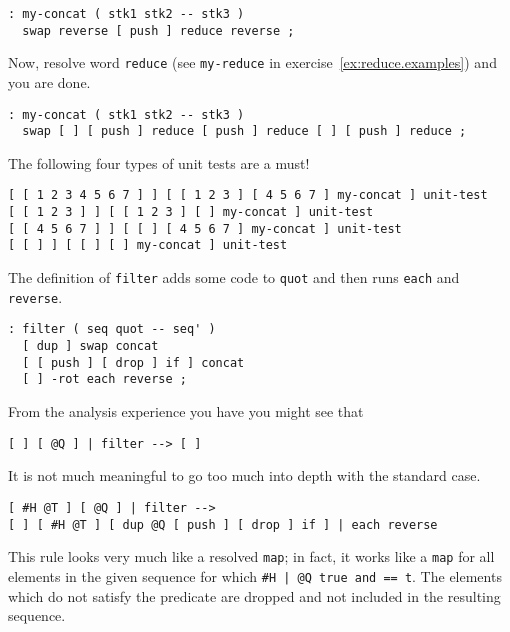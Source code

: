 \begin{verbatim}
: my-concat ( stk1 stk2 -- stk3 )
  swap reverse [ push ] reduce reverse ;
\end{verbatim}

Now, resolve word \verb|reduce| (see \verb|my-reduce| in exercise~\ref{ex:reduce.examples}) and you are done.

\begin{verbatim}
: my-concat ( stk1 stk2 -- stk3 )
  swap [ ] [ push ] reduce [ push ] reduce [ ] [ push ] reduce ;
\end{verbatim}

The following four types of unit tests are a must!

\begin{verbatim}
[ [ 1 2 3 4 5 6 7 ] ] [ [ 1 2 3 ] [ 4 5 6 7 ] my-concat ] unit-test
[ [ 1 2 3 ] ] [ [ 1 2 3 ] [ ] my-concat ] unit-test
[ [ 4 5 6 7 ] ] [ [ ] [ 4 5 6 7 ] my-concat ] unit-test
[ [ ] ] [ [ ] [ ] my-concat ] unit-test
\end{verbatim}

The definition of \verb|filter| adds some code to \verb|quot| and then runs \verb|each| and \verb|reverse|.

\begin{verbatim}
: filter ( seq quot -- seq' )
  [ dup ] swap concat
  [ [ push ] [ drop ] if ] concat
  [ ] -rot each reverse ;
\end{verbatim}

From the analysis experience you have you might see that

\begin{verbatim}
[ ] [ @Q ] | filter --> [ ]
\end{verbatim}

It is not much meaningful to go too much into depth with the standard case.

\begin{verbatim}
[ #H @T ] [ @Q ] | filter -->
[ ] [ #H @T ] [ dup @Q [ push ] [ drop ] if ] | each reverse
\end{verbatim}

This rule looks very much like a resolved \verb|map|; in fact, it works like a \verb|map| for all elements in the given sequence for which \verb!#H | @Q true and == t!. The elements which do not satisfy the predicate are dropped and not included in the resulting sequence. 


